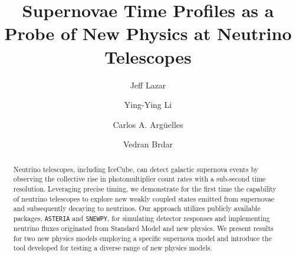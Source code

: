 
\title{
Supernovae Time Profiles as a Probe of New Physics at Neutrino Telescopes
}

\author{Jeff Lazar}
\author{Ying-Ying Li}
\author{Carlos A. Arg\"{u}elles}
\author{Vedran Brdar}


\begin{abstract}
Neutrino telescopes, including IceCube, can detect galactic supernova events by observing the collective rise in photomultiplier count rates with a sub-second time resolution. Leveraging precise timing, we demonstrate for the first time the capability of neutrino telescopes to explore new weakly coupled states emitted from supernovae and subsequently decaying to neutrinos. Our approach utilizes publicly available packages, \texttt{ASTERIA} and \texttt{SNEWPY}, for simulating detector responses and implementing neutrino fluxes originated from Standard Model and new physics. We present results for two new physics models
employing a specific supernova model and introduce the tool developed for testing a diverse range of new physics models.
\end{abstract}

\maketitle